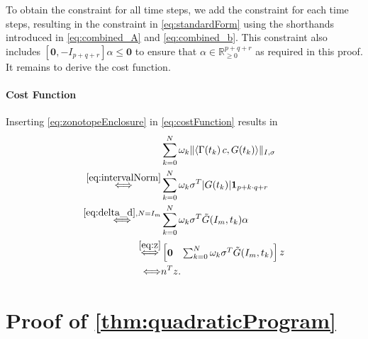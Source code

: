 \documentclass[EPiC]{easychair}
\renewcommand{\^}[1]{^{(#1)}}
\begin{document}
To obtain the constraint for all time steps, we add the constraint for each time steps, resulting in the constraint in \eqref{eq:standardForm} using the shorthands introduced in \eqref{eq:combined_A} and \eqref{eq:combined_b}. This constraint also includes $[\mathbf{0}, -I_{p+q+r}]\alpha \leq \mathbf{0}$ to ensure that $\alpha \in \mathbb{R}_{\geq 0}^{p+q+r}$ as required in this proof. It remains to derive the cost function.

\paragraph{Cost Function}
Inserting \eqref{eq:zonotopeEnclosure} in \eqref{eq:costFunction} results in
 \begin{align*} 
    & \sum_{k=0}^{N} \omega_k \| \langle \Gamma(t_k) \, c, G(t_k) \rangle \|_{I,\sigma} \\
    \overset{\eqref{eq:intervalNorm}}{\Longleftrightarrow} & \sum_{k=0}^{N} \omega_k \sigma^T |G(t_k)| \mathbf{1}_{p+k\cdot q + r} \\
    \overset{\eqref{eq:delta_d}, N=I_m}{\Longleftrightarrow} & \sum_{k=0}^{N} \omega_k \sigma^T \tilde{G}(I_m,t_k) \alpha \\
    \overset{\eqref{eq:z}}{\Longleftrightarrow} & \begin{bmatrix} \mathbf{0} & \sum_{k=0}^{N} \omega_k \sigma^T \tilde{G}(I_m,t_k) \end{bmatrix}  z \\
    \Longleftrightarrow & n^T z.
 \end{align*}
 
 \section{Proof of \cref{thm:quadraticProgram}} \label{sec:derivationOfQuadraticProgram}
 
\end{document}
